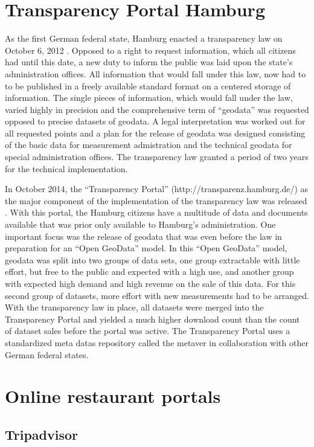 \documentclass[a4paper, 11pt, oneside]{Thesis}  %
\begin{document}
\section{Transparency Portal Hamburg}
As the first German federal state, Hamburg enacted a transparency law on October 6, 2012 \cite{Murjahn.2016}. Opposed to a right to request information, which all citizens had until this date, a new duty to inform the public was laid upon the state’s administration offices. All information that would fall under this law, now had to to be published in a freely available standard format on a centered storage of information. The single pieces of information, which would fall under the law, varied highly in precision and the comprehensive term of ``geodata'' was requested opposed to precise datasets of geodata. A legal interpretation was worked out for all requested points and a plan for the release of geodata was designed consisting of the basic data for measurement admistration and the technical geodata for special administration offices. The transparency law granted a period of two years for the technical implementation.

In October 2014, the ``Transparency Portal'' (http://transparenz.hamburg.de/) as the major component of the implementation of the transparency law was released \cite{Murjahn.2016}. With this portal, the Hamburg citizens have a multitude of data and documents available that was prior only available to Hamburg's administration. One important focus was the release of geodata that was even before the law in preparation for an ``Open GeoData'' model. In this ``Open GeoData'' model, geodata was split into two groups of data sets, one group extractable with little effort, but free to the public and expected with a high use, and another group with expected high demand and high revenue on the sale of this data. For this second group of datasets, more effort with new measurements had to be arranged. With the transparency law in place, all datasets were merged into the Transparency Portal and yielded a much higher download count than the count of dataset sales before the portal was active. The Transparency Portal uses a standardized meta datas repository called the \ac{metaver} in collaboration with other German federal states.

\section{Online restaurant portals}

\subsection{Tripadvisor}
\end{document}
